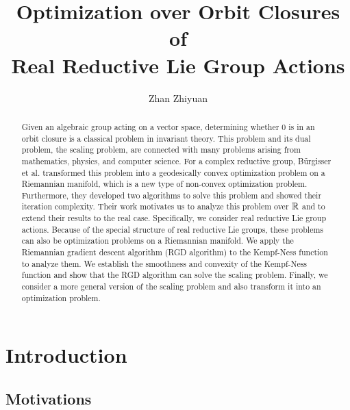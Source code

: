 \documentclass[suri,pdfbookmark]{engsuribt} %
\title{Optimization over Orbit Closures of \\ Real Reductive Lie Group Actions}
\author{Zhan Zhiyuan}
\begin{document}
\raggedbottom
\maketitle

\frontmatter
\begin{abstract}
  Given an algebraic group acting on a vector space, determining whether $0$ is in an orbit closure is a classical problem in invariant theory. This problem and its dual problem, the scaling problem, are connected with many problems arising from mathematics, physics, and computer science. For a complex reductive group, B{\"u}rgisser et al.  transformed this problem into a geodesically convex optimization problem on a Riemannian manifold, which is a new type of non-convex optimization problem. Furthermore, they developed two algorithms to solve this problem and showed their iteration complexity. Their work motivates us to analyze this problem over $\mathbb{R}$ and to extend their results to the real case. Specifically, we consider real reductive Lie group actions. Because of the special structure of real reductive Lie groups, these problems can also be optimization problems on a Riemannian manifold. We apply the Riemannian gradient descent algorithm (RGD algorithm) to the Kempf-Ness function to analyze them. We establish the smoothness and convexity of the Kempf-Ness function and show that the RGD algorithm can solve the scaling problem. Finally, we consider a more general version of the scaling problem and also transform it into an optimization problem.
\end{abstract}

\tableofcontents

\mainmatter  %

\chapter{Introduction}

  \section{Motivations}
\end{document}
